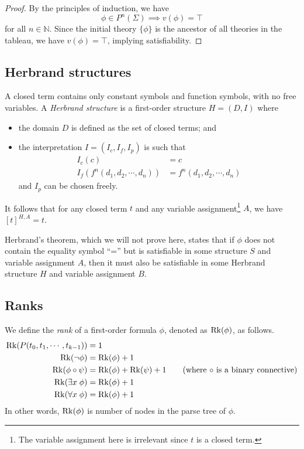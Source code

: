 \begin{proof}
    By the principles of induction, we have
    \[\phi \in P^n (\Sigma) \implies v(\phi) = \top\]
    for all \(n \in \mathbb{N}\). Since the initial theory \(\{\phi\}\) is the ancestor of all theories in the tableau, we have \(v(\phi) = \top\), implying satisfiability.
\end{proof}



\subsection{Herbrand structures}

A closed term contains only constant symbols and function symbols, with no free variables. A \emph{Herbrand structure} is a first-order structure \(H = (D, I)\) where
%
\begin{itemize}
    \item the domain \(D\) is defined as the set of closed terms; and
    \item the interpretation \(I = (I_c, I_f, I_p)\) is such that
    \begin{align*}
        I_c (c) &= c \tag{interpret each constant symbol as the symbol itself}\\
        I_f(f^n (d_1, d_2, \cdots, d_n)) &= f^n (d_1, d_2, \cdots, d_n) \tag{interpret each function as the string itself}
    \end{align*}
    and \(I_p\) can be chosen freely.
\end{itemize}
%
It follows that for any closed term \(t\) and any variable assignment\footnote{The variable assignment here is irrelevant since \(t\) is a closed term.} \(A\), we have \([t]^{H, A} = t\).

Herbrand's theorem, which we will not prove here, states that if \(\phi\) does not contain the equality symbol ``='' but is satisfiable in some structure \(S\) and variable assignment \(A\), then it must also be satisfiable in some Herbrand structure \(H\) and variable assignment \(B\).



\subsection{Ranks}

We define the \emph{rank} of a first-order formula \(\phi\), denoted as \(\operatorname{Rk}(\phi)\), as follows.
%
\begin{align*}
    \operatorname{Rk}(P(t_0, t_1, \cdots, t_{k-1})) &= 1\\
    \operatorname{Rk}(\neg\phi) &= \operatorname{Rk}(\phi) + 1\\
    \operatorname{Rk}(\phi\circ\psi) &= \operatorname{Rk}(\phi) + \operatorname{Rk}(\psi) + 1 \tag{where \(\circ\) is a binary connective}\\
    \operatorname{Rk}(\exists x\; \phi) &= \operatorname{Rk}(\phi) + 1\\
    \operatorname{Rk}(\forall x\; \phi) &= \operatorname{Rk}(\phi) + 1
\end{align*}
%
In other words, \(\operatorname{Rk}(\phi)\) is number of nodes in the parse tree of \(\phi\).


